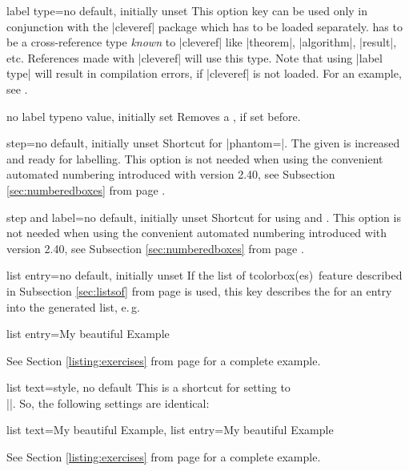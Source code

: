 \begin{docTcbKey}{label type}{=}{no default, initially unset}
This option key can be used only in conjunction with the |cleveref| package
\cite{cubitt:2013a} which has to be loaded separately.
 has to be a cross-reference type \emph{known} to |cleveref|
like |theorem|, |algorithm|, |result|, etc. References made with |cleveref|
will use this type. Note that using |label type| will result in compilation
errors, if |cleveref| is not loaded.
For an example, see .
\end{docTcbKey}

\begin{docTcbKey}{no label type}{}{no value, initially set}
Removes a , if set before.
\end{docTcbKey}

\begin{docTcbKey}{step}{=}{no default, initially unset}
Shortcut for |phantom={}|. The given  is
increased and ready for labelling. This option is not needed when
using the convenient automated numbering introduced with version 2.40,
see Subsection \ref{sec:numberedboxes}
from page \pageref{sec:numberedboxes}.
\end{docTcbKey}

\begin{docTcbKey}{step and label}{=}{no default, initially unset}
Shortcut for using  and . This option is not needed when
using the convenient automated numbering introduced with version 2.40,
see Subsection \ref{sec:numberedboxes}
from page \pageref{sec:numberedboxes}.
\end{docTcbKey}


\clearpage
\begin{docTcbKey}{list entry}{=}{no default, initially unset}
If the \flqq list of tcolorbox(es)\frqq\ feature described in Subsection
\ref{sec:listsof} from page \pageref{sec:listsof} is used, this key
describes the  for an entry into the generated list, e.\,g.
\begin{dispListing}
list entry={\protect\numberline{\thetcbcounter}My beautiful Example}
\end{dispListing}
See Section \ref{listing:exercises} from page \pageref{listing:exercises}
for a complete example.
\end{docTcbKey}

\begin{docTcbKey}[][doc new=2014-09-19]{list text}{=}{style, no default}
This is a shortcut for setting  to\\
|\protect\numberline{\thetcbcounter}|.
So, the following settings are identical:
\begin{dispListing}
list text={My beautiful Example},
list entry={\protect\numberline{\thetcbcounter}My beautiful Example}
\end{dispListing}
See Section \ref{listing:exercises} from page \pageref{listing:exercises}
for a complete example.
\end{docTcbKey}

